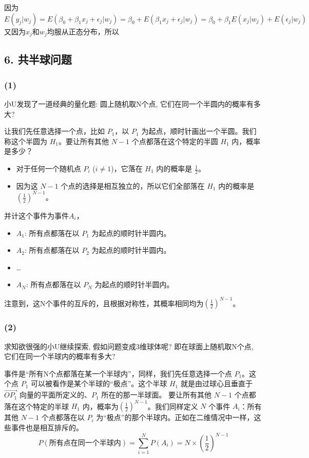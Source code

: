 \documentclass[UTF8]{ctexart}
\begin{document}
因为$E(y_{j}|w_{j})=E(\beta_{0}+\beta_{1}x_{j}+\epsilon_{j}|w_{j})=\beta_{0}+E(\beta_{1}x_{j}+\epsilon_{j}|w_{j})=\beta_{0}+\beta_{1}E(x_{j}|w_{j})+E(\epsilon_{j}|w_{j})$
又因为$x_{j}和w_{j}$均服从正态分布，所以
\subsection*{6. 共半球问题}
\subsubsection*{(1)}
小U发现了一道经典的量化题: 圆上随机取N个点, 它们在同一个半圆内的概率有多大?

让我们先任意选择一个点，比如 \(P_1\)，以 $P_1$ 为起点，顺时针画出一个半圆。我们称这个半圆为 $H_1$。要让所有其他 $N-1$ 个点都落在这个特定的半圆 $H_1$ 内，概率是多少？
\begin{itemize}
    \item 对于任何一个随机点 $P_i$ ($i \neq 1$)，它落在 $H_1$ 内的概率是 $\frac{1}{2}$。
    \item 因为这 $N-1$ 个点的选择是相互独立的，所以它们全部落在 $H_1$ 内的概率是 $(\frac{1}{2})^{N-1}$。
\end{itemize}
并计这个事件为事件$A_i$，
\begin{itemize}
    \item $A_1$: 所有点都落在以 $P_1$ 为起点的顺时针半圆内。
    \item $A_2$: 所有点都落在以 $P_2$ 为起点的顺时针半圆内。
    \item \dots
    \item $A_N$: 所有点都落在以 $P_N$ 为起点的顺时针半圆内。
\end{itemize}
注意到，这N个事件的互斥的，且根据对称性，其概率相同均为$(\frac{1}{2})^{N-1}$。
\subsubsection*{(2)}
求知欲很强的小U继续探索, 假如问题变成3维球体呢? 即在球面上随机取N个点, 它们在同一个半球内的概率有多大?

事件是“所有N个点都落在某一个半球内”，同样，我们先任意选择一个点 $P_1$。这个点 $P_1$ 可以被看作是某个半球的“极点”。这个半球 $H_1$ 就是由过球心且垂直于 $\vec{OP_1}$ 向量的平面所定义的、$P_1$ 所在的那一半球面。
要让所有其他 $N-1$ 个点都落在这个特定的半球 $H_1$ 内，概率为$(\frac{1}{2})^{N-1}$。我们同样定义 $N$ 个事件 $A_i$：所有其他 $N-1$ 个点都落在以 $P_i$ 为“极点”的那个半球内。正如在二维情况中一样，这些事件也是相互排斥的。
$$ P(\text{所有点在同一个半球内}) = \sum_{i=1}^{N} P(A_i) = N \times \left(\frac{1}{2}\right)^{N-1} $$
\end{document}
